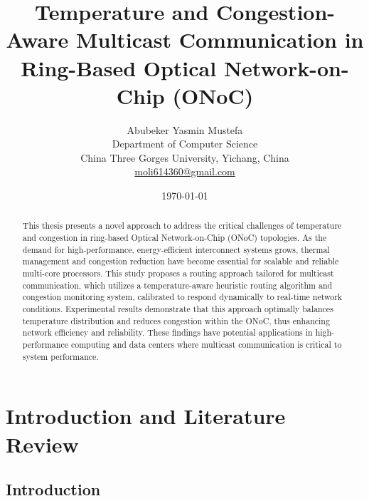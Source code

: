 \documentclass[12pt]{article}
\title{Temperature and Congestion-Aware Multicast Communication in Ring-Based Optical Network-on-Chip (ONoC)}
\author{
    \begin{tabular}{c}
        Abubeker Yasmin Mustefa \\
        \small Department of Computer Science \\
        \small China Three Gorges University, Yichang, China \\
        \small \href{mailto:moli614360@gmail.com}{moli614360@gmail.com}
    \end{tabular}
}
\date{\today}
\begin{document}
\maketitle

\begin{abstract}
This thesis presents a novel approach to address the critical challenges of temperature and congestion in ring-based Optical Network-on-Chip (ONoC) topologies. As the demand for high-performance, energy-efficient interconnect systems grows, thermal management and congestion reduction have become essential for scalable and reliable multi-core processors. This study proposes a routing approach tailored for multicast communication, which utilizes a temperature-aware heuristic routing algorithm and congestion monitoring system, calibrated to respond dynamically to real-time network conditions. Experimental results demonstrate that this approach optimally balances temperature distribution and reduces congestion within the ONoC, thus enhancing network efficiency and reliability. These findings have potential applications in high-performance computing and data centers where multicast communication is critical to system performance.
\end{abstract}

\setcounter{page}{1} %

\newpage

\tableofcontents
\newpage
\listoffigures
\newpage

\setcounter{page}{1} %

\chapter{Introduction and Literature Review}

\section{Introduction}
\end{document}
